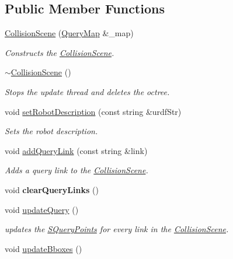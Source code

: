 \subsection*{Public Member Functions}
\begin{DoxyCompactItemize}
\item 
\hyperlink{classCollisionScene_ad814c6de8d0c1b6c3c9cf8e75ea19358}{Collision\-Scene} (\hyperlink{classMutexMap}{Query\-Map} \&\-\_\-map)
\begin{DoxyCompactList}\small\item\em Constructs the \hyperlink{classCollisionScene}{Collision\-Scene}. \end{DoxyCompactList}\item 
\hypertarget{classCollisionScene_a78292b107e0ba4d074749e8a45e52ae3}{\hyperlink{classCollisionScene_a78292b107e0ba4d074749e8a45e52ae3}{$\sim$\-Collision\-Scene} ()}\label{classCollisionScene_a78292b107e0ba4d074749e8a45e52ae3}

\begin{DoxyCompactList}\small\item\em Stops the update thread and deletes the octree. \end{DoxyCompactList}\item 
void \hyperlink{classCollisionScene_a76efb9371fd01bb1a372ddc9535f9537}{set\-Robot\-Description} (const string \&urdf\-Str)
\begin{DoxyCompactList}\small\item\em Sets the robot description. \end{DoxyCompactList}\item 
void \hyperlink{classCollisionScene_ad7e104a8659e5eb0c9f55c56b6f9011d}{add\-Query\-Link} (const string \&link)
\begin{DoxyCompactList}\small\item\em Adds a query link to the \hyperlink{classCollisionScene}{Collision\-Scene}. \end{DoxyCompactList}\item 
\hypertarget{classCollisionScene_aa1d80c51501b53bf176f1484fba7d3bd}{void {\bfseries clear\-Query\-Links} ()}\label{classCollisionScene_aa1d80c51501b53bf176f1484fba7d3bd}

\item 
\hypertarget{classCollisionScene_a0d1d5b732e65711bd783b27a9b866219}{void \hyperlink{classCollisionScene_a0d1d5b732e65711bd783b27a9b866219}{update\-Query} ()}\label{classCollisionScene_a0d1d5b732e65711bd783b27a9b866219}

\begin{DoxyCompactList}\small\item\em updates the \hyperlink{structCollisionScene_1_1SQueryPoints}{S\-Query\-Points} for every link in the \hyperlink{classCollisionScene}{Collision\-Scene}. \end{DoxyCompactList}\item 
\hypertarget{classCollisionScene_a35fffc2c243b08deac3914d2b0c80169}{void \hyperlink{classCollisionScene_a35fffc2c243b08deac3914d2b0c80169}{update\-Bboxes} ()}\label{classCollisionScene_a35fffc2c243b08deac3914d2b0c80169}


\end{DoxyCompactItemize}
